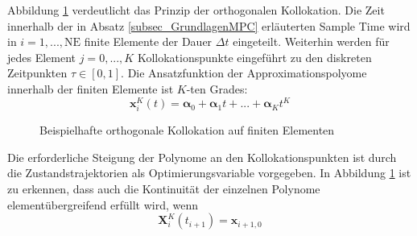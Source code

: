 Abbildung \ref{fig_Collocationdompc} verdeutlicht das Prinzip der orthogonalen Kollokation.
Die Zeit innerhalb der in Absatz \ref{subsec_GrundlagenMPC} erläuterten Sample Time wird in $i = 1,...,\mathrm{NE}$ finite Elemente der Dauer $\Delta t$ eingeteilt.
Weiterhin werden für jedes Element $j = 0,...,K$ Kollokationspunkte eingeführt zu den diskreten Zeitpunkten $\tau\in [0,1]$.
Die Ansatzfunktion der Approximationspolyome innerhalb der finiten Elemente ist $K$-ten Grades:
\begin{equation} \label{eq_AnsatzApprox}
    \boldsymbol{x}^{K}_{i}(t) = \boldsymbol{\alpha}_0+\boldsymbol{\alpha}_1t+...+\boldsymbol{\alpha}_{K}t^{K}
\end{equation}

\vspace*{-\baselineskip}
\begin{figure}[h!]
    \centering
    \setlength{\fboxsep}{1pt}
    \setlength{\fboxrule}{1pt}
    \caption[Beispielhafte orthogonale Kollokation auf finiten Elementen]{Beispielhafte orthogonale Kollokation auf finiten Elementen \cite{Dompc1}}
    \label{fig_Collocationdompc}
\end{figure}

Die erforderliche Steigung der Polynome an den Kollokationspunkten ist durch die Zustandstrajektorien als Optimierungsvariable vorgegeben.
In Abbildung \ref{fig_Collocationdompc} ist zu erkennen, dass auch die Kontinuität der einzelnen Polynome elementübergreifend erfüllt wird, wenn
\begin{equation} \label{eq_KontiDompc}
    \boldsymbol{X}^{K}_{i}(t_{i+1})=\boldsymbol{x}_{i+1,0}
\end{equation}

